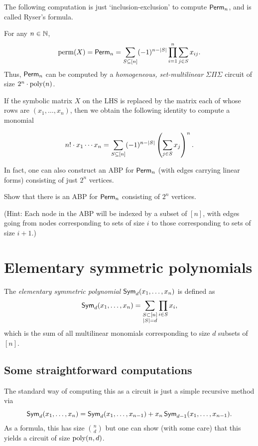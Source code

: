 The following computation is just `inclusion-exclusion' to compute $\operatorname{\mathsf{Perm}}_n$, and is called Ryser's formula. 

\begin{lemma} For any $n \in \mathbb{N}$, 
  \[
  \operatorname{perm}(X) = \operatorname{\mathsf{Perm}}_n = \sum_{S \subseteq [n]} (-1)^{n-|S|} \prod_{i=1}^n \sum_{j\in S} x_{ij}.
  \]
  Thus, $\operatorname{\mathsf{Perm}}_n$ can be computed by a \emph{homogeneous, set-multilinear} $\Sigma\Pi\Sigma$ circuit of size $2^n \cdot \operatorname{poly}(n)$. 
\end{lemma}

If the symbolic matrix $X$ on the LHS is replaced by the matrix each of whose rows are $(x_1, \ldots, x_n)$, then we obtain the following identity to compute a monomial

\begin{lemma}
\[
n! \cdot x_1 \cdots x_n = \sum_{S \subseteq [n]} (-1)^{n - |S|} \left(\sum_{j \in S} x_j\right)^n.
\]
\end{lemma}

In fact, one can also construct an ABP for $\operatorname{\mathsf{Perm}}_n$ (with edges carrying linear forms) consisting of just $2^n$ vertices. 

\begin{exercise}
Show that there is an ABP for $\operatorname{\mathsf{Perm}}_n$ consisting of $2^n$ vertices. 

(Hint: Each node in the ABP will be indexed by a subset of $[n]$, with edges going from nodes corresponding to sets of size $i$ to those corresponding to sets of size $i+1$.)
\end{exercise}

\section{Elementary symmetric polynomials}

The \emph{elementary symmetric polynomial} $\operatorname{\mathsf{Sym}}_d(x_1,\ldots, x_n)$ is defined as 
\[
\operatorname{\mathsf{Sym}}_d(x_1,\ldots, x_n) = \sum_{\substack{S \subset [n]\\|S| = d}} \prod_{i\in S} x_i,
\]
which is the sum of all multilinear monomials corresponding to size $d$ subsets of $[n]$. 

\subsection{Some straightforward computations}

The standard way of computing this as a circuit is just a simple recursive method via 
\[
\operatorname{\mathsf{Sym}}_{d}(x_1,\ldots, x_n) = \operatorname{\mathsf{Sym}}_{d}(x_1,\ldots, x_{n-1}) + x_n \operatorname{\mathsf{Sym}}_{d-1}(x_1,\ldots, x_{n-1}).
\]
As a formula, this has size $\binom{n}{d}$ but one can show (with some care) that this yields a circuit of size $\operatorname{poly}(n,d)$. 


